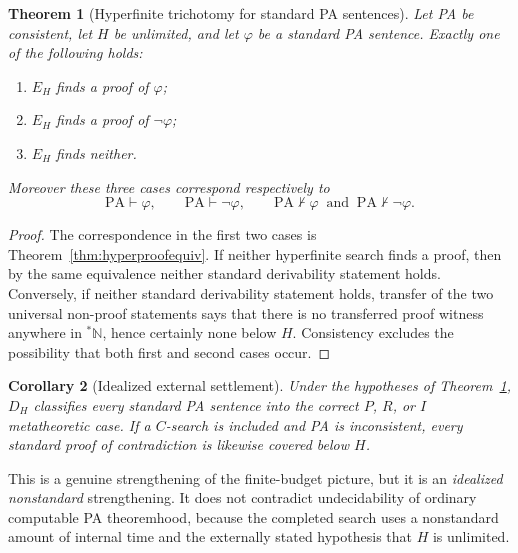\documentclass[11pt,openany]{book}
\newtheorem{theorem}{Theorem}[chapter]
\newtheorem{corollary}[theorem]{Corollary}
\theoremstyle{definition}
\theoremstyle{remark}
\newcommand{\N}{\mathbb{N}}
\begin{document}
\begin{theorem}[Hyperfinite trichotomy for standard PA sentences]\label{thm:hypertrichotomy}
Let PA be consistent, let $H$ be unlimited, and let $\varphi$ be a standard PA sentence. Exactly one of the following holds:
\begin{enumerate}[label=(\roman*)]
\item $E_H$ finds a proof of $\varphi$;
\item $E_H$ finds a proof of $\neg\varphi$;
\item $E_H$ finds neither.
\end{enumerate}
Moreover these three cases correspond respectively to
\[
\mathrm{PA}\vdash\varphi,\qquad
\mathrm{PA}\vdash\neg\varphi,\qquad
\mathrm{PA}\nvdash\varphi\ \text{ and }\ \mathrm{PA}\nvdash\neg\varphi.
\]
\end{theorem}
\begin{proof}
The correspondence in the first two cases is Theorem~\ref{thm:hyperproofequiv}. If neither hyperfinite search finds a proof, then by the same equivalence neither standard derivability statement holds. Conversely, if neither standard derivability statement holds, transfer of the two universal non-proof statements says that there is no transferred proof witness anywhere in ${}^*\N$, hence certainly none below $H$. Consistency excludes the possibility that both first and second cases occur.
\end{proof}

\begin{corollary}[Idealized external settlement]\label{cor:hyperdecider}
Under the hypotheses of Theorem~\ref{thm:hypertrichotomy}, $D_H$ classifies every standard PA sentence into the correct $P$, $R$, or $I$ metatheoretic case. If a $C$-search is included and PA is inconsistent, every standard proof of contradiction is likewise covered below $H$.
\end{corollary}

This is a genuine strengthening of the finite-budget picture, but it is an \emph{idealized nonstandard} strengthening. It does not contradict undecidability of ordinary computable PA theoremhood, because the completed search uses a nonstandard amount of internal time and the externally stated hypothesis that $H$ is unlimited.
\end{document}
